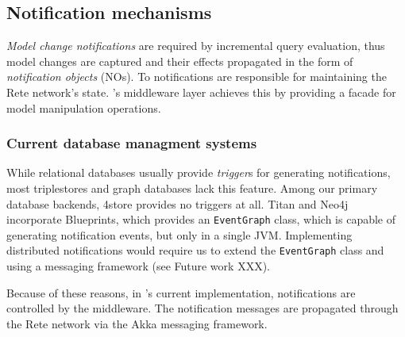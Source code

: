 \subsection{Notification mechanisms}

\emph{Model change notifications} are required by incremental query evaluation, thus model changes are captured and their effects propagated in the form of \emph{notification objects} (NOs). To notifications are responsible for maintaining the Rete network's state. \iqd{}'s middleware layer achieves this by providing a facade for model manipulation operations. 

\subsubsection{Current database managment systems}

While relational databases usually provide \emph{trigger}s for generating notifications, most triplestores and graph databases lack this feature. Among our primary database backends, 4store provides no triggers at all. Titan and Neo4j incorporate Blueprints, which provides an \texttt{EventGraph} class, which is capable of generating notification events, but only in a single JVM. Implementing distributed notifications would require us to extend the \texttt{EventGraph} class and using a messaging framework (see Future work XXX). 

Because of these reasons, in \iqd{}'s current implementation, notifications are controlled by the middleware. The notification messages are propagated through the Rete network via the Akka messaging framework. 

